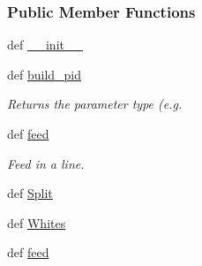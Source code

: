 \subsubsection*{\-Public \-Member \-Functions}
\begin{DoxyCompactItemize}
\item 
def \hyperlink{classforcebalance_1_1psi4io_1_1GBS__Reader_a9cc5f721f9933963c2074031e3847a6e}{\-\_\-\-\_\-init\-\_\-\-\_\-}
\item 
def \hyperlink{classforcebalance_1_1psi4io_1_1GBS__Reader_ab461d28706b6392858ea4d6edf503088}{build\-\_\-pid}
\begin{DoxyCompactList}\small\item\em \-Returns the parameter type (e.\-g. \end{DoxyCompactList}\item 
def \hyperlink{classforcebalance_1_1psi4io_1_1GBS__Reader_a1cf1d95963bbed1b130331cfb290e4fd}{feed}
\begin{DoxyCompactList}\small\item\em \-Feed in a line. \end{DoxyCompactList}\item 
def \hyperlink{classforcebalance_1_1BaseReader_acded199bbc003eb93d071a972ef38901}{\-Split}
\item 
def \hyperlink{classforcebalance_1_1BaseReader_af2af8a559625614474a1c6fe245b5e13}{\-Whites}
\item 
def \hyperlink{classforcebalance_1_1BaseReader_a3c46942ef8cc25ece21d52be5b7ba05f}{feed}
\end{DoxyCompactItemize}
